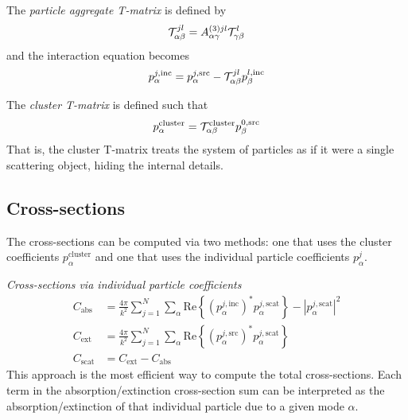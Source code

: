 \documentclass[11pt]{article}
\begin{document}
The \emph{particle aggregate T-matrix} is defined by 
\begin{equation}
    \mathcal{T}_{\alpha\beta}^{jl} =
    A_{\alpha \gamma}^{(3)jl}
    \mathcal{T}_{\gamma \beta}^l
\label{eqn:particle_aggregate_tmatrix}
\end{equation}
and the interaction equation becomes
\begin{equation}
    p_{\alpha}^{j,\text{inc}} = 
    p_{\alpha}^{j,\text{src}} -
    \mathcal{T}_{\alpha \beta}^{jl}
    p_{\beta}^{l,\text{inc}}
\end{equation}

The \emph{cluster T-matrix} is defined such that
\begin{equation}
    p_\alpha^{\text{cluster}} = \mathcal{T}_{\alpha\beta}^{\text{cluster}} p_\beta^{0,\text{src}}
\label{eqn:cluster_tmatrix}
\end{equation}
That is, the cluster T-matrix treats the system of particles as if it were a single scattering object, hiding the internal details.

\subsection{Cross-sections}

The cross-sections can be computed via two methods: one that uses the cluster coefficients $p_\alpha^\text{cluster}$ and one that uses the individual particle coefficients $p_\alpha^j$.

\hfill

\textit{Cross-sections via individual particle coefficients}
\begin{subequations}
\begin{align}
    C_\text{abs} &= \frac{4\pi}{k^2} \sum_{j=1}^N \sum_{\alpha}
    \text{Re} \left\{(p_\alpha^{j,\text{inc}})^* p_\alpha^{j,\text{scat}} \right\} 
        - |p_\alpha^{j,\text{scat}}|^2\\
    C_\text{ext} &= \frac{4\pi}{k^2} \sum_{j=1}^N \sum_{\alpha}
    \text{Re} \left\{(p_\alpha^{j,\text{src}})^* p_\alpha^{j,\text{scat}} \right\} \\
    C_\text{scat} &= C_\text{ext} - C_\text{abs}
\end{align}
\label{eqn:cross_sections}
\end{subequations}
This approach is the most efficient way to compute the total cross-sections.
Each term in the absorption/extinction cross-section sum can be interpreted as the absorption/extinction of that individual particle due to a given mode $\alpha$.
\end{document}
